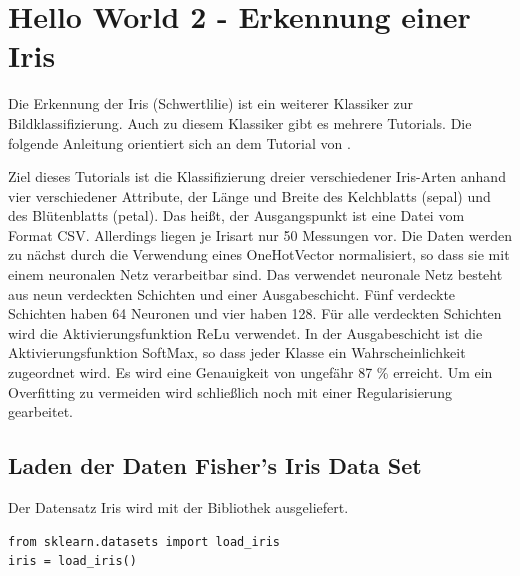 \begin{code}

%
\caption{Erstellung eines Convolutional Netwerks}\label{TensorFlow:Complete}
\end{code}


\section{\glqq Hello World 2\grqq {} - Erkennung einer Iris}

Die Erkennung der Iris (Schwertlilie) ist ein weiterer Klassiker zur Bildklassifizierung. Auch zu diesem Klassiker gibt es mehrere Tutorials.  Die folgende Anleitung orientiert sich an dem Tutorial von \cite{KDnuggets.07.12.2020}.

Ziel dieses Tutorials ist die Klassifizierung dreier verschiedener Iris-Arten anhand vier verschiedener Attribute, der Länge und Breite des Kelchblatts (sepal) und des Blütenblatts (petal). Das heißt, der Ausgangspunkt ist eine Datei vom Format CSV. Allerdings liegen je Irisart nur 50 Messungen vor. Die Daten werden zu nächst durch die Verwendung eines \glqq OneHotVector\grqq{} normalisiert, so dass sie mit einem  neuronalen Netz verarbeitbar sind. Das verwendet neuronale Netz besteht aus neun verdeckten Schichten und einer Ausgabeschicht. Fünf verdeckte Schichten haben 64 Neuronen und vier haben 128. Für alle verdeckten Schichten wird die Aktivierungsfunktion ReLu verwendet. In der Ausgabeschicht ist die Aktivierungsfunktion SoftMax, so dass jeder Klasse ein Wahrscheinlichkeit zugeordnet wird. Es wird eine Genauigkeit von ungefähr 87 \% erreicht. Um ein Overfitting zu vermeiden wird schließlich noch mit einer Regularisierung gearbeitet.







\subsection{Laden der Daten Fisher's Iris Data Set}

Der Datensatz \glqq Iris\grqq{} wird mit der Bibliothek  ausgeliefert.

\begin{code}
    \begin{lstlisting}[numbers=none]
from sklearn.datasets import load_iris
iris = load_iris()
\end{lstlisting}
\caption{Laden des Datensatzes Iris}
\end{code}

